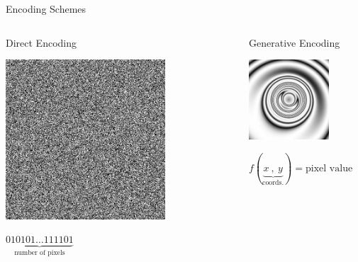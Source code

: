 \documentclass[6pt]{beamer}
\begin{document}
{\begin{frame}{Encoding Schemes}
\begin{columns}[T] %
\begin{column}{.49\textwidth}
\begin{block}{Direct Encoding}
\begin{center}
\includegraphics[width=0.7\textwidth]{../Figures/Misc/direct.jpg}
\end{center}
\end{block}
\centering
$\underbrace{010101\ldots111101}_\text{number of pixels}$
\end{column}%
\pause
\hfill%
\begin{column}{.49\textwidth}
\begin{block}{Generative Encoding}
\begin{center}
\includegraphics[width=0.7\textwidth]{../Figures/Misc/picBreed1.jpg}
\end{center}
\end{block}
\centering
$f(\underbrace{x\   ,\  y}_\text{coords.}) = \text{pixel value}$
\end{column}%
\end{columns}
\end{frame}
}
\end{document}
